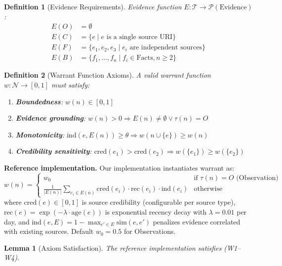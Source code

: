 \documentclass[11pt,a4paper]{article}
\newtheorem{definition}{Definition}[section]
\newtheorem{lemma}[theorem]{Lemma}
\begin{document}
\begin{definition}[Evidence Requirements]
\label{def:evidence}
Evidence function $E: \mathcal{T} \to \mathcal{P}(\text{Evidence})$:
\begin{align*}
E(O) &= \emptyset \\
E(C) &= \{e \mid e \text{ is a single source URI}\} \\
E(F) &= \{e_1, e_2, e_3 \mid e_i \text{ are independent sources}\} \\
E(B) &= \{f_1, \ldots, f_n \mid f_i \in \text{Facts}, n \geq 2\}
\end{align*}
\end{definition}

\begin{definition}[Warrant Function Axioms]
\label{def:warrant}
A valid warrant function $w: \mathcal{N} \to [0,1]$ must satisfy:
\begin{enumerate}[noitemsep]
    \item[(W1)] \textbf{Boundedness}: $w(n) \in [0,1]$
    \item[(W2)] \textbf{Evidence grounding}: $w(n) > 0 \Rightarrow E(n) \neq \emptyset \vee \tau(n) = O$
    \item[(W3)] \textbf{Monotonicity}: $\text{ind}(e, E(n)) \geq \theta \Rightarrow w(n \cup \{e\}) \geq w(n)$
    \item[(W4)] \textbf{Credibility sensitivity}: $\text{cred}(e_1) > \text{cred}(e_2) \Rightarrow w(\{e_1\}) \geq w(\{e_2\})$
\end{enumerate}
\end{definition}

\textbf{Reference implementation.} Our implementation instantiates warrant as:
\[
w(n) = \begin{cases}
w_0 & \text{if } \tau(n) = O \text{ (Observation)} \\[4pt]
\displaystyle\frac{1}{|E(n)|} \sum_{e_i \in E(n)} \text{cred}(e_i) \cdot \text{rec}(e_i) \cdot \text{ind}(e_i) & \text{otherwise}
\end{cases}
\]
where $\text{cred}(e) \in [0,1]$ is source credibility (configurable per source type), $\text{rec}(e) = \exp(-\lambda \cdot \text{age}(e))$ is exponential recency decay with $\lambda = 0.01$ per day, and $\text{ind}(e, E) = 1 - \max_{e' \in E} \text{sim}(e, e')$ penalizes evidence correlated with existing sources. Default $w_0 = 0.5$ for Observations.

\begin{lemma}[Axiom Satisfaction]
\label{lem:monotone}
The reference implementation satisfies (W1--W4).
\end{lemma}
\end{document}
